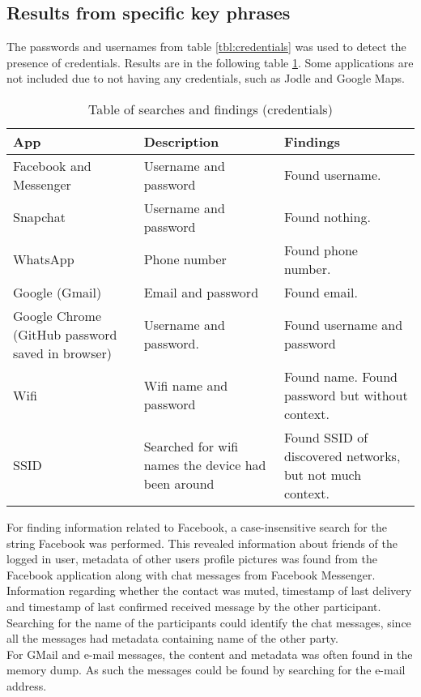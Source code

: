 \subsection{Results from specific key phrases}
The passwords and usernames from table \ref{tbl:credentials} was used to detect the presence of credentials. Results are in the following table \ref{spesificS_table}. Some applications are not included due to not having any credentials, such as Jodle and Google Maps.

\begin{table}[h]
\centering
\begin{tabular}{|m{2.5cm}|m{2.5cm}|m{2.5cm}|}
\hline
App & Description & Findings \\
\hline
Facebook and Messenger & Username and password & Found username.  \\
\hline
Snapchat & Username and password & Found nothing. \\
\hline
WhatsApp & Phone number & Found phone number. \\
\hline 
Google (Gmail) & Email and password & Found email.\\
\hline
Google Chrome (GitHub password saved in browser) & Username and password. & Found username and password \\
\hline
Wifi & Wifi name and password & Found name. Found password but without context.\\  
\hline
SSID & Searched for wifi names the device had been around & Found SSID of discovered networks, but not much context.  \\  
\hline
\end{tabular}
\caption{Table of searches and findings (credentials)}
\label{spesificS_table}
\end{table}


For finding information related to Facebook, a case-insensitive search for the string Facebook was performed. This revealed information about friends of the logged in user, metadata of other users profile pictures was found from the Facebook application along with chat messages from Facebook Messenger. Information regarding whether the contact was muted, timestamp of last delivery and timestamp of last confirmed received message by the other participant. Searching for the name of the participants could identify the chat messages, since all the messages had metadata containing name of the other party.\\

For GMail and e-mail messages, the content and metadata was often found in the memory dump. As such the messages could be found by searching for the e-mail address.

